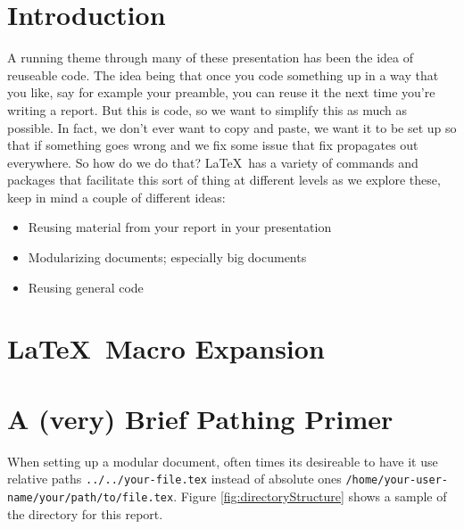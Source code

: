 \documentclass[hidelinks, float=false, crop=false]{standalone}
\begin{document}
{}
    \section{Introduction}
        A running theme through many of these presentation has been the idea of reuseable code.
        The idea being that once you code something up in a way that you like, say for example your preamble, you can reuse it the next time you're writing a report.
        But this is code, so we want to simplify this as much as possible.
        In fact, we don't ever want to copy and paste, we want it to be set up so that if something goes wrong and we fix some issue that fix propagates out everywhere.
        So how do we do that?
        \LaTeX~has a variety of commands and packages that facilitate this sort of thing at different levels as we explore these, keep in mind a couple of different ideas:
        \begin{itemize}
            \item Reusing material from your report in your presentation
            \item Modularizing documents; especially big documents
            \item Reusing general code
        \end{itemize}
    \section{\LaTeX~Macro Expansion}
    \section{A (very) Brief Pathing Primer}
        When setting up a modular document, often times its desireable to have it use relative paths \texttt{../../your-file.tex} instead of absolute ones \texttt{/home/your-user-name/your/path/to/file.tex}.
        Figure \ref{fig:directoryStructure} shows a sample of the directory for this report.
\end{document}
